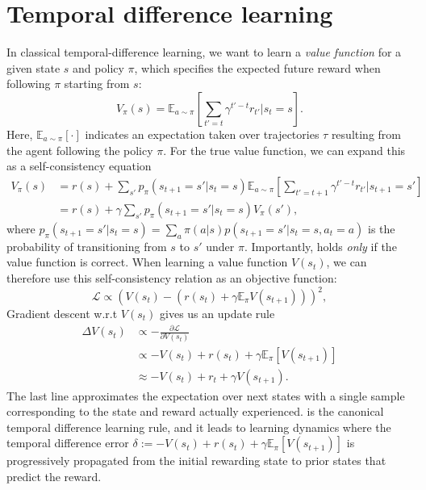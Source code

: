 \section{Temporal difference learning}
\label{sec:temporal_difference}

In classical temporal-difference learning, we want to learn a \emph{value function} for a given state $s$ and policy $\pi$, which specifies the expected future reward when following $\pi$ starting from $s$:
\begin{equation}
    \label{eq:V-values}
    V_{\pi}(s) = \mathbb{E}_{a \sim \pi} \left [ \sum_{t' = t} \gamma^{t' - t} r_{t'} | s_t = s \right ].
\end{equation}
Here, $\mathbb{E}_{a \sim \pi} [ \cdot ]$ indicates an expectation taken over trajectories $\tau$ resulting from the agent following the policy $\pi$.
For the true value function, we can expand this as a self-consistency equation
\begin{align}
    \label{eq:value_expansion}
    V_{\pi}(s) &= r(s) + \sum_{s'} p_{\pi}(s_{t+1} = s' | s_t = s) \mathbb{E}_{a \sim \pi} \left [ \sum_{t' = t+1} \gamma^{t' - t} r_{t'} | s_{t+1} = s' \right ] \\
    &=  r(s) + \gamma \sum_{s'} p_{\pi}(s_{t+1} = s' | s_t = s) V_{\pi}(s'),
\end{align}
where $p_{\pi}(s_{t+1} = s' | s_t = s) = \sum_a \pi(a|s) p(s_{t+1} = s' | s_t = s, a_t = a)$ is the probability of transitioning from $s$ to $s'$ under $\pi$.
Importantly,  holds \emph{only} if the value function is correct.
%
When learning a value function $V(s_t)$, we can therefore use this self-consistency relation as an objective function:
\begin{equation}
    \mathcal{L} \propto \left (  V(s_t) - (r(s_t) + \gamma \mathbb{E}_\pi V(s_{t+1})) \right )^2,
\end{equation}
Gradient descent w.r.t $V(s_t)$ gives us an update rule
\begin{align}
    \label{eq:TD-learning}
    \Delta V(s_t) &\propto - \frac{\partial \mathcal{L}}{\partial V(s_t)}\\
    &\propto - V(s_t) + r(s_t) + \gamma \mathbb{E}_\pi \left [ V(s_{t+1}) \right ]\\
    &\approx - V(s_t) + r_t + \gamma V(s_{t+1}).
\end{align}
The last line approximates the expectation over next states with a single sample corresponding to the state and reward actually experienced.
 is the canonical temporal difference learning rule, and it leads to learning dynamics where the temporal difference error $\delta := - V(s_t) + r(s_t) + \gamma \mathbb{E}_\pi \left [ V(s_{t+1}) \right ]$ is progressively propagated from the initial rewarding state to prior states that predict the reward.
